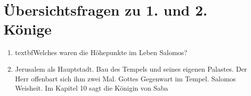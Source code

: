 \section{Übersichtsfragen zu 1. und 2. Könige}
\begin{enumerate}
    \item textbf{Welches waren die Höhepunkte im Leben Salomos?}
    \item Jerusalem als Hauptstadt. Bau des Tempels und seines eigenen Palastes. Der Herr offenbart sich ihm zwei Mal. Gottes Gegenwart im Tempel. Salomos Weisheit. Im Kapitel 10 sagt die Königin von Saba
\end{enumerate}